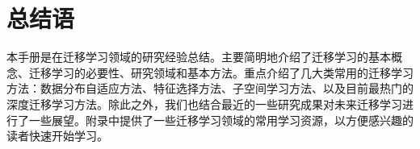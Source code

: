 \newpage
\section{总结语}

本手册是在迁移学习领域的研究经验总结。主要简明地介绍了迁移学习的基本概念、迁移学习的必要性、研究领域和基本方法。重点介绍了几大类常用的迁移学习方法：数据分布自适应方法、特征选择方法、子空间学习方法、以及目前最热门的深度迁移学习方法。除此之外，我们也结合最近的一些研究成果对未来迁移学习进行了一些展望。附录中提供了一些迁移学习领域的常用学习资源，以方便感兴趣的读者快速开始学习。